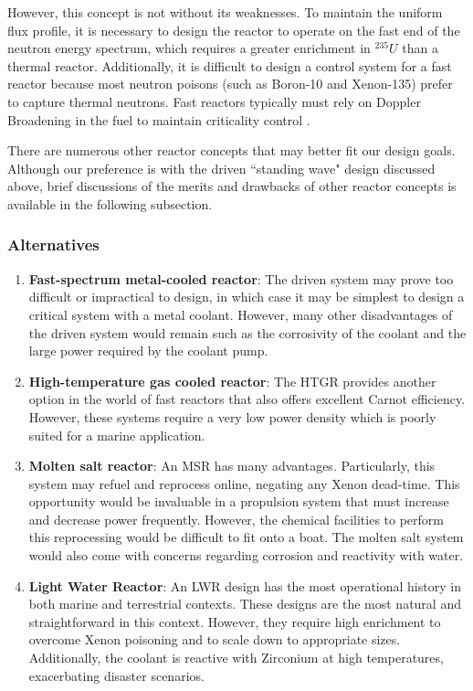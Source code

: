 \documentclass[12pt]{article}
\begin{document}
However, this concept is not without its weaknesses. To maintain the uniform flux profile, it is necessary to design the reactor to operate on the fast end of the neutron energy spectrum, which requires a greater enrichment in $^{235}U$ than a thermal reactor. Additionally, it is difficult to design a control system for a fast reactor because most neutron poisons (such as Boron-10 and Xenon-135) prefer to capture thermal neutrons. Fast reactors typically must rely on Doppler Broadening in the fuel to maintain criticality control \cite{ebr2}.

There are numerous other reactor concepts that may better fit our design goals. Although our preference is with the driven ``standing wave" design discussed above, brief discussions of the merits and drawbacks of other reactor concepts is available in the following subsection.

\subsubsection{Alternatives}
\begin{enumerate}
    \item \textbf{Fast-spectrum metal-cooled reactor}: The driven system may prove too difficult or impractical to design, in which case it may be simplest to design a critical system with a metal coolant. However, many other disadvantages of the driven system would remain such as the corrosivity of the coolant and the large power required by the coolant pump.
    \item \textbf{High-temperature gas cooled reactor}: The HTGR provides another option in the world of fast reactors that also offers excellent Carnot efficiency. However, these systems require a very low power density which is poorly suited for a marine application.
    \item \textbf{Molten salt reactor}: An MSR has many advantages. Particularly, this system may refuel and reprocess online, negating any Xenon dead-time. This opportunity would be invaluable in a propulsion system that must increase and decrease power frequently. However, the chemical facilities to perform this reprocessing would be difficult to fit onto a boat. The molten salt system would also come with concerns regarding corrosion and reactivity with water.
    \item \textbf{Light Water Reactor}: An LWR design has the most operational history in both marine and terrestrial contexts. These designs are the most natural and straightforward in this context. However, they require high enrichment to overcome Xenon poisoning and to scale down to appropriate sizes. Additionally, the coolant is reactive with Zirconium at high temperatures, exacerbating disaster scenarios.
\end{enumerate}
\end{document}
